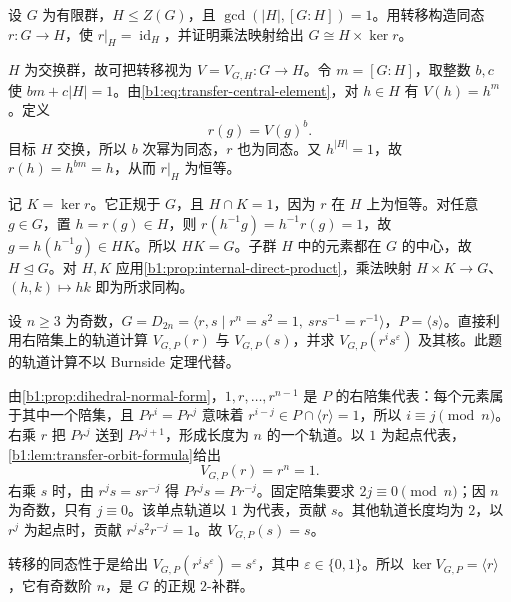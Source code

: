 \begin{exercise}\label{b1:ex:C-transfer-central-direct-factor}
	设 \(G\) 为有限群，\(H\leq Z(G)\)，且 \(\gcd(|H|,[G:H])=1\)。用转移构造同态 \(r:G\rightarrow H\)，使 \(r|_H=\operatorname{id}_H\)，并证明乘法映射给出 \(G\cong H\times\ker r\)。
\end{exercise}

\begin{solution}
	\(H\) 为交换群，故可把转移视为 \(V=V_{G,H}:G\rightarrow H\)。令 \(m=[G:H]\)，取整数 \(b,c\) 使 \(bm+c|H|=1\)。由\eqref{b1:eq:transfer-central-element}，对 \(h\in H\) 有 \(V(h)=h^m\)。定义
	\[
		r(g)=V(g)^b.
	\]
	目标 \(H\) 交换，所以 \(b\) 次幂为同态，\(r\) 也为同态。又 \(h^{|H|}=1\)，故 \(r(h)=h^{bm}=h\)，从而 \(r|_H\) 为恒等。

	记 \(K=\ker r\)。它正规于 \(G\)，且 \(H\cap K=1\)，因为 \(r\) 在 \(H\) 上为恒等。对任意 \(g\in G\)，置 \(h=r(g)\in H\)，则 \(r(h^{-1}g)=h^{-1}r(g)=1\)，故 \(g=h(h^{-1}g)\in HK\)。所以 \(HK=G\)。子群 \(H\) 中的元素都在 \(G\) 的中心，故 \(H\trianglelefteq G\)。对 \(H,K\) 应用\cref{b1:prop:internal-direct-product}，乘法映射 \(H\times K\rightarrow G\)、\((h,k)\mapsto hk\) 即为所求同构。
\end{solution}

\begin{exercise}\label{b1:ex:C-transfer-odd-dihedral}
	设 \(n\geq3\) 为奇数，\(G=D_{2n}=\langle r,s\mid r^n=s^2=1,\ srs^{-1}=r^{-1}\rangle\)，\(P=\langle s\rangle\)。直接利用右陪集上的轨道计算 \(V_{G,P}(r)\) 与 \(V_{G,P}(s)\)，并求 \(V_{G,P}(r^is^\varepsilon)\) 及其核。此题的轨道计算不以 Burnside 定理代替。
\end{exercise}

\begin{solution}
	由\cref{b1:prop:dihedral-normal-form}，\(1,r,\ldots,r^{n-1}\) 是 \(P\) 的右陪集代表：每个元素属于其中一个陪集，且 \(Pr^i=Pr^j\) 意味着 \(r^{i-j}\in P\cap\langle r\rangle=1\)，所以 \(i\equiv j\pmod n\)。右乘 \(r\) 把 \(Pr^j\) 送到 \(Pr^{j+1}\)，形成长度为 \(n\) 的一个轨道。以 \(1\) 为起点代表，\cref{b1:lem:transfer-orbit-formula}给出
	\[
		V_{G,P}(r)=r^n=1.
	\]
	右乘 \(s\) 时，由 \(r^js=sr^{-j}\) 得 \(Pr^js=Pr^{-j}\)。固定陪集要求 \(2j\equiv0\pmod n\)；因 \(n\) 为奇数，只有 \(j\equiv0\)。该单点轨道以 \(1\) 为代表，贡献 \(s\)。其他轨道长度均为 \(2\)，以 \(r^j\) 为起点时，贡献 \(r^js^2r^{-j}=1\)。故 \(V_{G,P}(s)=s\)。

	转移的同态性于是给出 \(V_{G,P}(r^is^\varepsilon)=s^\varepsilon\)，其中 \(\varepsilon\in\{0,1\}\)。所以 \(\ker V_{G,P}=\langle r\rangle\)，它有奇数阶 \(n\)，是 \(G\) 的正规 \(2\)-补群。
\end{solution}

